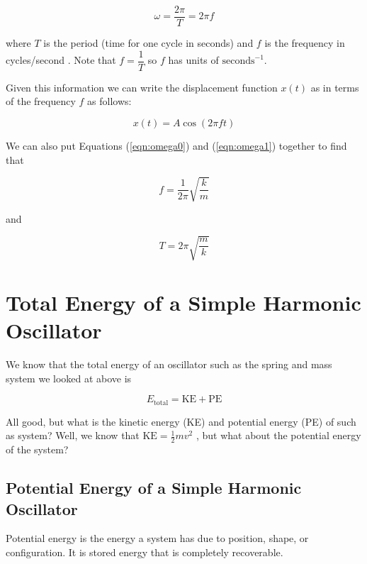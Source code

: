 \documentclass{article}
\theoremstyle{definition}
\begin{document}
\begin{equation}
\omega = \dfrac{2 \pi}{T} = 2 \pi f
\label{eqn:omega1}
\end{equation}

\bigskip
\noindent
where $T$ is the period (time for one cycle in seconds) and $f$
is the frequency in cycles/second \cite{wiki:angular_frequency}.
Note that $f = \dfrac{1}{T}$ so $f$ has units of
$\text{seconds}^{-1}$.

\bigskip
\noindent
Given this information we can write the displacement function
$x(t)$ as in terms of the frequency $f$ as follows:

\begin{equation*}
x(t) = A \cos (2 \pi f t)
\end{equation*}

\bigskip
\noindent
We can also put Equations (\ref{eqn:omega0}) and (\ref{eqn:omega1}) 
together to find that

\begin{equation*}
f = \dfrac{1}{2 \pi} \sqrt{\dfrac{k}{m}}
\end{equation*}

\noindent
and

\begin{equation*}
T = 2 \pi \sqrt{\dfrac{m}{k}}
\end{equation*}


\section{Total Energy of a Simple Harmonic Oscillator}
We know that the total energy of an oscillator  
such as the spring and mass system we looked 
at above is

\vspace{-0.15cm}
\begin{equation*}
E_{\text{total}} = \text{KE} + \text{PE}
\end{equation*}

\medskip
\noindent
All good, but what is the kinetic energy (KE) and potential
energy (PE) of such as system? Well, we know that 
$\text{KE} = \frac{1}{2} mv^{2}$ \cite{kinetic_energy}, but 
what about the potential energy of the system?

\subsection{Potential Energy of a Simple Harmonic Oscillator}
Potential energy is the energy a system has due to position,
shape, or configuration. It is stored energy that is completely
recoverable.
\end{document}
